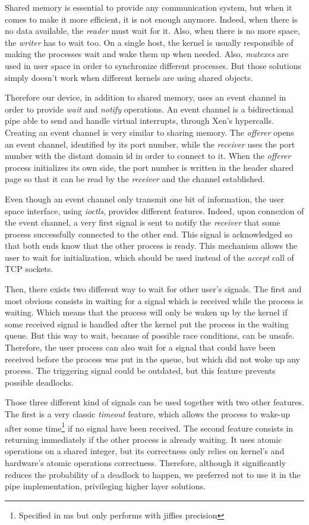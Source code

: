 \documentclass[journal]{IEEEtran}
\begin{document}
Shared memory is essential to provide any communication system, but when it comes to make it more efficient, it is not enough anymore. Indeed, when there is no data available, the \emph{reader} must wait for it. Also, when there is no more space, the \emph{writer} has to wait too. On a single host, the kernel is usually responsible of making the processes wait and wake them up when needed. Also, \emph{mutexes} are used in user space in order to synchronize different processes. But those solutions simply doesn't work when different kernels are using shared objects.

Therefore our device, in addition to shared memory, uses an event channel in order to provide \emph{wait} and \emph{notify} operations. An event channel is a bidirectional pipe able to send and handle virtual interrupts, through Xen's hypercalls. Creating an event channel is very similar to sharing memory. The \emph{offerer} opens an event channel, identified by its port number, while the \emph{receiver} uses the port number with the distant domain id in order to connect to it.
When the \emph{offerer} process initializes its own side, the port number is written in the header shared page so that it can be read by the \emph{receiver} and the channel established. 

Even though an event channel only transmit one bit of information, the user space interface, using \emph{ioctls}, provides different features. Indeed, upon connexion of the event channel, a very first signal is sent to notify the \emph{receiver} that some process successfully connected to the other end. This signal is acknowledged so that both ends know that the other process is ready. This mechanism allows the user to wait for initialization, which should be used instead of the \emph{accept} call of TCP sockets.

Then, there exists two different way to wait for other user's signals. The first and most obvious consists in waiting for a signal which is received while the process is waiting. Which means that the process will only be waken up by the kernel if some received signal is handled after the kernel put the process in the waiting queue.  But this way to wait, because of possible race conditions, can be unsafe. Therefore, the user process can also wait for a signal that could have been received before the process was put in the queue, but which did not woke up any process. The triggering signal could be outdated, but this feature prevents possible deadlocks. 

Those three different kind of signals can be used together with two other features. The first is a very classic \emph{timeout} feature, which allows the process to wake-up after some time\footnote{Specified in ms but only performs with jiffies precision} if no signal have been received. The second feature consists in returning immediately if the other process is already waiting. It uses atomic operations on a shared integer, but its correctness only relies on kernel's and hardware's atomic operations correctness. Therefore, although it significantly reduces the probability of a deadlock to happen, we preferred not to use it in the pipe implementation, privileging higher layer solutions.
\end{document}
